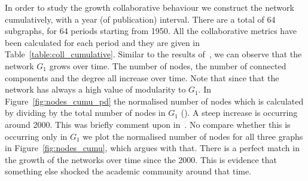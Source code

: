 \documentclass{article}
\theoremstyle{definition}
\newcommand{\authors}{}
\begin{document}
In order to study the growth collaborative behaviour we construct the network
cumulatively, with a year (of publication) interval. There are a total of
64 subgraphs, for 64 periods starting from 1950. All the collaborative metrics
have been calculated for each period and they are given in Table~\ref{table:coll_cumulative}.
Similar to the results of~\cite{Liu2015}, we can observe that the network \(G_1\)
grows over time. The number of nodes, the number of connected components and
the degree all increase over time. Note that since that the network has always
a high value of modularity to \(G_1\).
In Figure~\ref{fig:nodes_cumu_pd} the normalised number of nodes which is
calculated by dividing by the total number of nodes in \(G_1\) (\authors).
A steep increase is occurring around 2000. This was briefly comment upon in~\cite{Liu2015}.
No compare whether this is occurring only in \(G_1\) we plot the normalised number
of nodes for all three graphs in Figure~\ref{fig:nodes_cumu}, which argues
with that. There is a perfect match in the growth of the networks over
time since the 2000. This is evidence that something else shocked the academic
community around that time.
\end{document}
